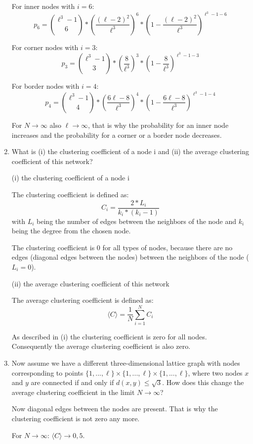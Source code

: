 \begin{enumerate}
	For inner nodes with $i=6$:
	\begin{equation}
	p_6 = {{\ell^3-1}\choose{6}} * (\frac{(\ell-2)^2}{\ell^3})^6 * (1-{\frac{(\ell-2)^2}{\ell^3}})^{\ell^3-1-6}
	\end{equation}
	
	For corner nodes with $i=3$:
	\begin{equation}
	p_3 = {{\ell^3-1}\choose{3}} * ({\frac{8}{\ell^3}})^3 * (1-{\frac{8}{\ell^3}})^{\ell^3-1-3}
	\end{equation}
	
	For border nodes with $i=4$:
	\begin{equation}
	p_4 = {{\ell^3-1}\choose{4}} * ({\frac{6\ell-8}{\ell^3}})^4 * (1-{\frac{6\ell-8}{\ell^3}})^{\ell^3-1-4}
	\end{equation}
	
	For $N \rightarrow \infty$ also $\ell \rightarrow \infty$, that is why the probability for an inner node increases and the probability for a corner or a border node decreases.
	
	\item What is (i) the clustering coefficient of a node i and (ii) the average clustering coefficient of this network?
	\vspace{0.25cm}
	
	(i) the clustering coefficient of a node i
	
	The clustering coefficient is defined as:
	\begin{equation}
	C_i = \frac{2*L_i}{k_i * (k_i-1)}
	\end{equation}
	with $L_i$ being the number of edges between the neighbors of the node and $k_i$ being the degree from the chosen node.
	
	The clustering coefficient is 0 for all types of nodes, because there are no edges (diagonal edges between the nodes) between the neighbors of the node ($L_i = 0$).
	
	(ii) the average clustering coefficient of this network
	
	The average clustering coefficient is defined as:
	\begin{equation}
	\langle C \rangle = \frac{1}{N} \sum_{i=1}^{N} C_i
	\end{equation}
	
	As described in (i) the clustering coefficient is zero for all nodes. Con\-se\-quent\-ly the average clustering coefficient is also zero.
	
	\item Now assume we have a different three-dimensional lattice graph with nodes corresponding to points $\{1,...,\ell\}\times\{1,...,\ell\}\times\{1,...,\ell\}$, where two nodes $x$ and $y$ are connected if and only if $d(x,y) \leq \sqrt{3}$. How	does this change the average clustering coefficient in the limit $N \rightarrow \infty$?
	\vspace{0.25cm}
	
	Now diagonal edges between the nodes are present. That is why the clustering coefficient is not zero any more.
	
	For $N \rightarrow \infty$: $\langle C \rangle \rightarrow 0,5$.
	
\end{enumerate}